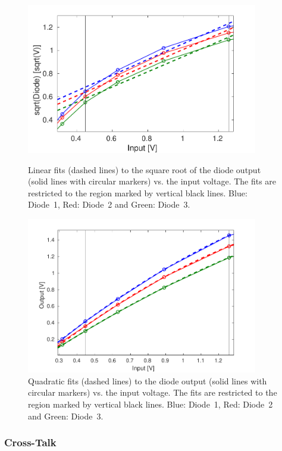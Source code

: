 \begin{figure}
  \centering
  \includegraphics[width=0.9\textwidth]{Figures/phaseMons/LinFitSqrtDiodeVsVolts}
  \caption{Linear fits (dashed lines) to the square root of the diode output (solid lines with circular markers) vs. the input voltage. The fits are restricted to the region marked by vertical black lines. Blue: Diode~1, Red: Diode~2 and Green: Diode~3.}
  \label{f:LinFitSqrtDiodeVsVolts}
  \centering
  \includegraphics[width=0.9\textwidth]{Figures/phaseMons/QuadFitDiodeVsVolts}
  \caption{Quadratic fits (dashed lines) to the diode output (solid lines with circular markers) vs. the input voltage. The fits are restricted to the region marked by vertical black lines. Blue: Diode~1, Red: Diode~2 and Green: Diode~3.}
  \label{f:QuadFitDiodeVsVolts}
\end{figure}

\subsubsection{Cross-Talk}

